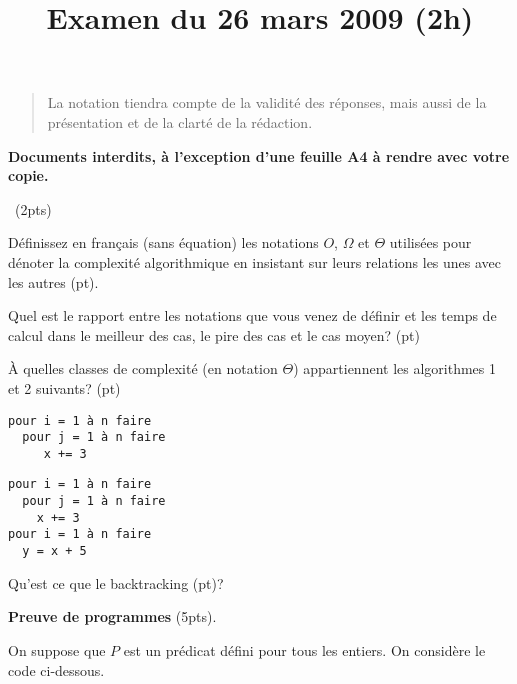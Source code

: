 \documentclass[10pt]{article}\usepackage[nu]{esial}
\begin{document}
\title{Examen du 26 mars 2009 (2h)}
\maketitle

\bigskip
\begin{quote}
  La notation tiendra compte de la validité des réponses, mais aussi de la
  présentation et de la clarté de la rédaction. 
\end{quote}

\bigskip
\begin{centering}
  \textbf{\large Documents interdits, à l'exception d'une feuille A4 à rendre
    avec votre copie.}
\end{centering}


\bigskip\QuestionCours~(2pts)

\Question Définissez en français (sans équation) les notations $O$, $\Omega$ et
$\Theta$ utilisées pour dénoter la complexité algorithmique en insistant sur
leurs relations les unes avec les autres (\textonehalf pt).   

\Question Quel est le rapport entre les notations que vous venez de définir et
les temps de calcul dans le meilleur des cas, le pire des cas et le cas moyen? (\textonehalf pt)

\Question À quelles classes de complexité (en notation $\Theta$) appartiennent
les algorithmes 1 et 2 suivants? (\textonehalf pt)

\medskip\noindent\begin{minipage}{.45\linewidth}
  \begin{Verbatim}[label=algorithme 1]
pour i = 1 à n faire
  pour j = 1 à n faire
     x += 3    
  \end{Verbatim}
\end{minipage}\hfill\begin{minipage}{.45\linewidth}
  \begin{Verbatim}[label=algorithme 2]
pour i = 1 à n faire
  pour j = 1 à n faire
    x += 3
pour i = 1 à n faire
  y = x + 5
  \end{Verbatim}
\end{minipage}

\Question Qu'est ce que le backtracking (\textonehalf pt)?



\Exercice\textbf{Preuve de programmes} (5pts).

On suppose que $P$ est un prédicat défini pour tous les entiers. On considère
le code ci-dessous.
\end{document}
